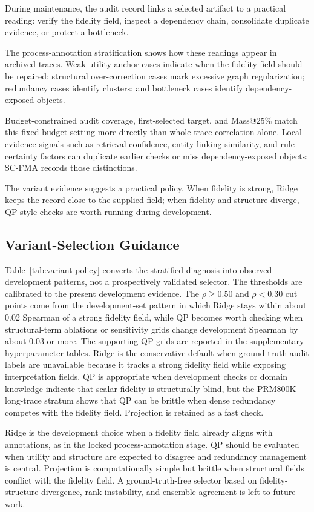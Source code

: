 During maintenance, the audit record links a selected artifact to a practical reading: verify the fidelity field, inspect a dependency chain, consolidate duplicate evidence, or protect a bottleneck.

The process-annotation stratification shows how these readings appear in archived traces. Weak utility-anchor cases indicate when the fidelity field should be repaired; structural over-correction cases mark excessive graph regularization; redundancy cases identify clusters; and bottleneck cases identify dependency-exposed objects.

Budget-constrained audit coverage, first-selected target, and Mass@25\% match this fixed-budget setting more directly than whole-trace correlation alone. Local evidence signals such as retrieval confidence, entity-linking similarity, and rule-certainty factors can duplicate earlier checks or miss dependency-exposed objects; SC-FMA records those distinctions.

The variant evidence suggests a practical policy. When fidelity is strong, Ridge keeps the record close to the supplied field; when fidelity and structure diverge, QP-style checks are worth running during development.

\subsection{Variant-Selection Guidance}

Table~\ref{tab:variant-policy} converts the stratified diagnosis into observed development patterns, not a prospectively validated selector. The thresholds are calibrated to the present development evidence. The $\rho \ge 0.50$ and $\rho < 0.30$ cut points come from the development-set pattern in which Ridge stays within about 0.02 Spearman of a strong fidelity field, while QP becomes worth checking when structural-term ablations or sensitivity grids change development Spearman by about 0.03 or more. The supporting QP grids are reported in the supplementary hyperparameter tables. Ridge is the conservative default when ground-truth audit labels are unavailable because it tracks a strong fidelity field while exposing interpretation fields. QP is appropriate when development checks or domain knowledge indicate that scalar fidelity is structurally blind, but the PRM800K long-trace stratum shows that QP can be brittle when dense redundancy competes with the fidelity field. Projection is retained as a fast check.

Ridge is the development choice when a fidelity field already aligns with annotations, as in the locked process-annotation stage. QP should be evaluated when utility and structure are expected to disagree and redundancy management is central. Projection is computationally simple but brittle when structural fields conflict with the fidelity field. A ground-truth-free selector based on fidelity-structure divergence, rank instability, and ensemble agreement is left to future work.

